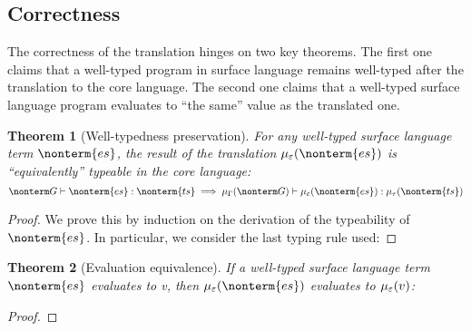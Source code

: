 \documentclass[a4paper]{article}
\newtheorem{theorem}{Theorem}
\begin{document}
\subsection{Correctness}

The correctness of the translation hinges on two key theorems.
The first one claims that a well-typed program in surface language remains well-typed after the translation to the core language.
The second one claims that a well-typed surface language program evaluates to ``the same'' value as the translated one.

\begin{theorem}[Well-typedness preservation]
  For any well-typed surface language term $\nonterm{es}$,
  the result of the translation $\tranterm(\nonterm{es})$ is ``equivalently'' typeable in the core language:
  \[
    \nonterm G \vdash \nonterm{es} : \nonterm{ts} \implies \tranctx(\nonterm G) \vdash \tranterm(\nonterm{es}) : \tranty(\nonterm{ts})
  \]
\end{theorem}
\begin{proof}
  We prove this by induction on the derivation of the typeability of $\nonterm{es}$.
  In particular, we consider the last typing rule used:
\end{proof}

\begin{theorem}[Evaluation equivalence]
  If a well-typed surface language term $\nonterm{es}$ evaluates to v, then $\tranterm(\nonterm{es})$ evaluates to $\mu_\varepsilon(v)$:
\end{theorem}
\begin{proof}
\end{proof}



\end{document}

